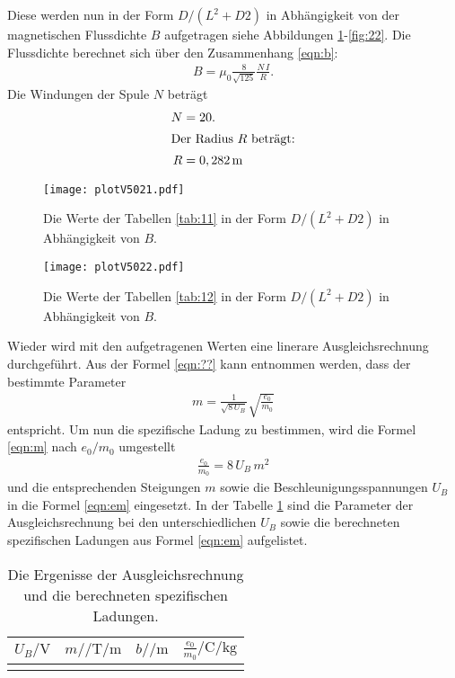 Diese werden nun in der Form $D/(L^2+D2)$ in Abhängigkeit von der magnetischen Flussdichte $B$ aufgetragen
siehe Abbildungen \ref{fig:11}-\ref{fig:22}.
Die Flussdichte berechnet sich über den Zusammenhang \eqref{eqn:b}:
\begin{align}
  B=\mu_0\frac{8}{\sqrt{125}}\frac{N\,I}{R}.\label{eqn:b}
\end{align}
Die Windungen der Spule $N$ beträgt
\begin{align*}
  N&=20.\\
  \intertext{Der Radius $R$ beträgt:}
R&=0,282\,\si{\meter}
\end{align*}

\begin{figure}
 \centering
 \texttt{[image: plotV5021.pdf]}
 \caption{Die Werte der Tabellen \ref{tab:11}
in der Form $D/(L^2+D2)$ in Abhängigkeit von $B$.}
 \label{fig:11}
\end{figure}


\begin{figure}
 \centering
 \texttt{[image: plotV5022.pdf]}
 \caption{Die Werte der Tabellen \ref{tab:12}
  in der Form $D/(L^2+D2)$ in Abhängigkeit von $B$.}
 \label{fig:12}
\end{figure}

Wieder wird mit den aufgetragenen Werten
eine linerare Ausgleichsrechnung durchgeführt.
Aus der Formel \eqref{eqn:??} kann
entnommen werden, dass
der bestimmte Parameter
\begin{align}
m=\frac{1}{\sqrt{8\,U_B}}\sqrt{\frac{e_0}{m_0}}\label{eqn:m}
\end{align}
entspricht. Um nun die spezifische Ladung zu bestimmen,
 wird die Formel \eqref{eqn:m} nach $e_0/m_0$ umgestellt
\begin{align*}
  \frac{e_0}{m_0}=8\,U_B\,m^2\label{eqn:em}
\end{align*}
und die entsprechenden Steigungen $m$ sowie die
Beschleunigungsspannungen $U_B$ in die Formel \eqref{eqn:em}
eingesetzt.
In der Tabelle \ref{tab:em} sind die Parameter der
Ausgleichsrechnung bei den unterschiedlichen $U_B$ sowie die berechneten spezifischen Ladungen aus Formel \eqref{eqn:em}
aufgelistet.


\begin{table}
  \centering
  \caption{Die Ergenisse der Ausgleichsrechnung und die berechneten spezifischen Ladungen.}
  \label{tab:em}
  \begin{tabular}{c c c c}
  \toprule  %
$U_B/\si{\volt}$ & $m/\si{\per\tesla\per\meter}$ & $b/\si{\per\meter}$ & $\frac{e_0}{m_0}/\si{\coulomb\per\kilo\gram}$ \\
  \midrule
&  &  &   \\
\bottomrule
\end{tabular}
\end{table}
\FloatBarrier

